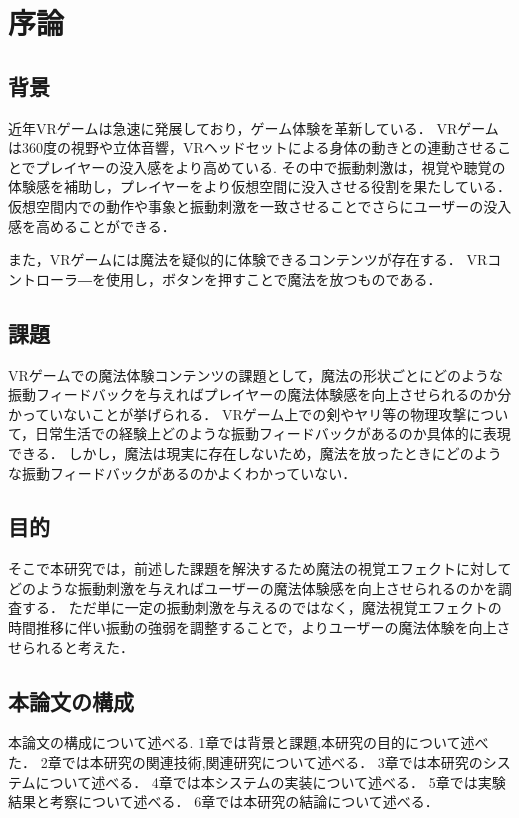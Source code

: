 \chapter{序論}
\section{背景}
近年VRゲームは急速に発展しており，ゲーム体験を革新している．
VRゲームは360度の視野や立体音響，VRヘッドセットによる身体の動きとの連動させることでプレイヤーの没入感をより高めている.
その中で振動刺激は，視覚や聴覚の体験感を補助し，プレイヤーをより仮想空間に没入させる役割を果たしている．
仮想空間内での動作や事象と振動刺激を一致させることでさらにユーザーの没入感を高めることができる．

また，VRゲームには魔法を疑似的に体験できるコンテンツが存在する．
VRコントローラ―を使用し，ボタンを押すことで魔法を放つものである．


\section{課題}
VRゲームでの魔法体験コンテンツの課題として，魔法の形状ごとにどのような振動フィードバックを与えればプレイヤーの魔法体験感を向上させられるのか分かっていないことが挙げられる．
VRゲーム上での剣やヤリ等の物理攻撃について，日常生活での経験上どのような振動フィードバックがあるのか具体的に表現できる．
しかし，魔法は現実に存在しないため，魔法を放ったときにどのような振動フィードバックがあるのかよくわかっていない．


\section{目的}
そこで本研究では，前述した課題を解決するため魔法の視覚エフェクトに対してどのような振動刺激を与えればユーザーの魔法体験感を向上させられるのかを調査する．
ただ単に一定の振動刺激を与えるのではなく，魔法視覚エフェクトの時間推移に伴い振動の強弱を調整することで，よりユーザーの魔法体験を向上させられると考えた．

\section{本論文の構成}
本論文の構成について述べる.
1章では背景と課題,本研究の目的について述べた．
2章では本研究の関連技術,関連研究について述べる．
3章では本研究のシステムについて述べる．
4章では本システムの実装について述べる．
5章では実験結果と考察について述べる．
6章では本研究の結論について述べる．
